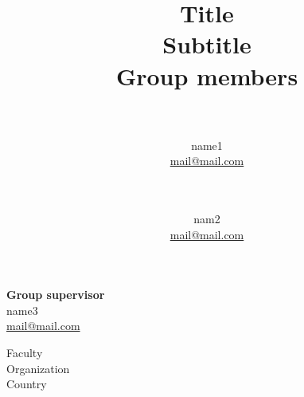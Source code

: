 \title{\vspace{-4.5cm}\textbf{\Huge Title\\\large Subtitle}\vspace{1cm}\\\large\textbf{Group members}\vspace{-.5cm}}
\author{
	\vspace{-1.2cm}\\\makebox[2in]{\hrulefill}\\\normalsize name1 \\\normalsize \href{mailto:mail@mail.com}{mail@mail.com}
	\and\vspace{-1.2cm}\\\makebox[2in]{\hrulefill}\\\normalsize nam2 \\\normalsize \href{mailto:nidam16@mail@mail.com}{mail@mail.com}}

\begin{titlepage}
	{\let\newpage\relax\maketitle}
	\setcounter{page}{-1}
	\begin{center}
		\large \textbf{Group supervisor} \\
		\normalsize name3 \\
		\href{mailto:mail@mail.com}{mail@mail.com}\\
		\vspace{1cm}

		\large
		Faculty\\
		Organization\\
		Country\\

	\end{center}
\end{titlepage}
